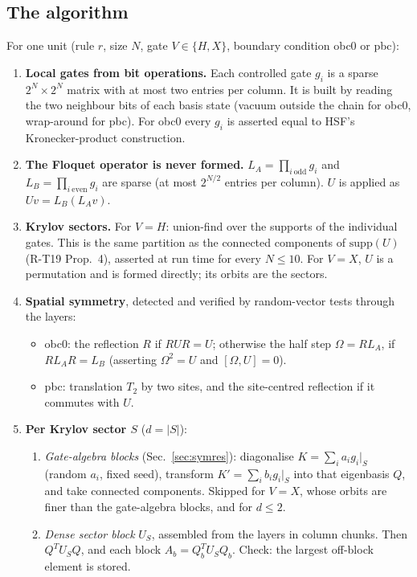 \subsection{The algorithm}
For one unit (rule $r$, size $N$, gate $V\in\{H,X\}$, boundary condition obc0 or pbc):
\begin{enumerate}
\item \textbf{Local gates from bit operations.} Each controlled gate $g_i$ is a sparse $2^N\times2^N$ matrix with at most
  two entries per column. It is built by reading the two neighbour bits of each basis state (vacuum outside the chain
  for obc0, wrap-around for pbc). For obc0 every $g_i$ is asserted equal to HSF's Kronecker-product construction.
\item \textbf{The Floquet operator is never formed.} $L_A=\prod_{i\ \mathrm{odd}}g_i$ and $L_B=\prod_{i\ \mathrm{even}}g_i$
  are sparse (at most $2^{N/2}$ entries per column). $U$ is applied as $Uv=L_B(L_Av)$.
\item \textbf{Krylov sectors.} For $V=H$: union-find over the supports of the individual gates. This is the same
  partition as the connected components of $\mathrm{supp}(U)$ (R-T19 Prop.~4), asserted at run time for every $N\le10$.
  For $V=X$, $U$ is a permutation and is formed directly; its orbits are the sectors.
\item \textbf{Spatial symmetry}, detected and verified by random-vector tests through the layers:
  \begin{itemize}
  \item obc0: the reflection $R$ if $RUR=U$; otherwise the half step $\Omega=RL_A$, if $RL_AR=L_B$ (asserting $\Omega^2=U$
    and $[\Omega,U]=0$).
  \item pbc: translation $T_2$ by two sites, and the site-centred reflection if it commutes with $U$.
  \end{itemize}
\item \textbf{Per Krylov sector $S$} ($d=|S|$):
  \begin{enumerate}
  \item \emph{Gate-algebra blocks} (Sec.~\ref{sec:symres}): diagonalise $K=\sum_ia_ig_i|_S$ (random $a_i$, fixed seed),
    transform $K'=\sum_ib_ig_i|_S$ into that eigenbasis $Q$, and take connected components. Skipped for $V=X$, whose
    orbits are finer than the gate-algebra blocks, and for $d\le2$.
  \item \emph{Dense sector block} $U_S$, assembled from the layers in column chunks. Then $Q^TU_SQ$, and each block
    $A_b=Q_b^TU_SQ_b$. Check: the largest off-block element is stored.

\end{enumerate}
\end{enumerate}

